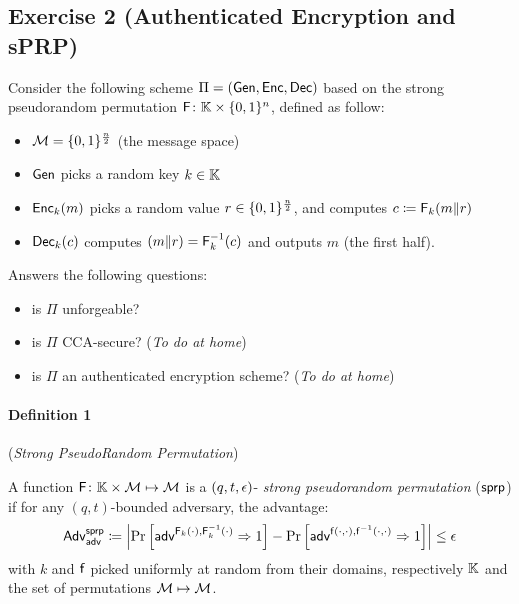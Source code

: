 \subsection{Exercise 2 (Authenticated Encryption and sPRP)}

Consider the following scheme $\Pi=(\operatorname{\mathsf{Gen}},\operatorname{\mathsf{Enc}},\operatorname{\mathsf{Dec}})$ based on the strong pseudorandom permutation $\operatorname{\mathsf{F}} \colon \mathbb{K} \times \lbrace 0,1 \rbrace^n$, defined as follow:
\begin{itemize}
	\item $\mathcal{M}=\{0, 1\}^{\frac{n}{2}}$ (the message space)
	\item $\operatorname{\mathsf{Gen}}$ picks a random key $k \in \mathbb{K}$
	\item $\operatorname{\mathsf{Enc}}_k(m)$ picks a random value $r \in \{0, 1\}^{\frac{n}{2}}$, and computes $c \coloneqq \operatorname{\mathsf{F}}_k(m \| r)$
	\item $\operatorname{\mathsf{Dec}}_k(c)$ computes $(m\|r)=\operatorname{\mathsf{F}}^{-1}_k(c)$ and outputs $m$ (the first half).
\end{itemize}
Answers the following questions:
\begin{itemize}
	\item is $\Pi$ unforgeable?
	\item is $\Pi$ CCA-secure? (\emph{To do at home})
	\item is $\Pi$ an authenticated encryption scheme? (\emph{To do at home})
\end{itemize}

\paragraph{Definition 1} \label{def: sprp} (\emph{Strong PseudoRandom Permutation})

A function $\operatorname{\mathsf{F}} \colon \mathbb{K} \times \mathcal{M} \mapsto \mathcal{M}$ is a $(q,t,\epsilon)$-\emph{ strong pseudorandom permutation} ($\operatorname{\mathsf{sprp}}$) if for any $(q,t)$-bounded adversary, the advantage:
\[ \mathsf{Adv}^{\operatorname{\mathsf{sprp}}}_{\operatorname{\mathsf{adv}}}\coloneqq
\left| \Pr\left[ \operatorname{\mathsf{adv}}^{\operatorname{\mathsf{F}}_k(\cdot),\operatorname{\mathsf{F}}_k^{-1}(\cdot)}\Rightarrow 1 \right] -
\Pr\left[ \operatorname{\mathsf{adv}}^{\operatorname{\mathsf{f}}(\cdot,\cdot),\operatorname{\mathsf{f}}^{-1}(\cdot,\cdot)}\Rightarrow 1 \right] \right|
\leq \epsilon \]
with $k$  and $\operatorname{\mathsf{f}}$ picked uniformly at random from their domains, respectively $\mathbb{K}$ and the set of permutations $\mathcal{M} \mapsto \mathcal{M}$.


